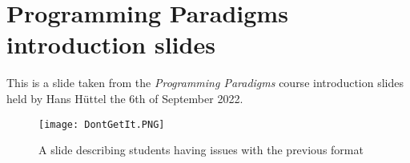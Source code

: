 \chapter{Programming Paradigms introduction slides} \label{chap:PP-intro}
This is a slide taken from the \textit{Programming Paradigms} course introduction slides held by Hans Hüttel the 6th of September 2022.

\begin{figure}[H]
	\texttt{[image: DontGetIt.PNG]}
	\centering
	\caption{A slide describing students having issues with the previous format}
	\label{fig:PP-intro}
\end{figure}